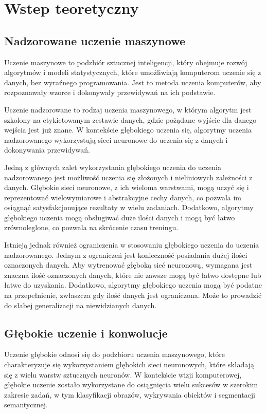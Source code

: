 \newpage %
\section{Wstep teoretyczny}


\subsection{Nadzorowane uczenie maszynowe}
Uczenie maszynowe to podzbiór sztucznej inteligencji, który obejmuje rozwój algorytmów i modeli statystycznych, które umożliwiają komputerom uczenie się z danych, bez wyraźnego programowania. Jest to metoda uczenia komputerów, aby rozpoznawały wzorce i dokonywały przewidywań na ich podstawie.

Uczenie nadzorowane to rodzaj uczenia maszynowego, w którym algorytm jest szkolony na etykietowanym zestawie danych, gdzie pożądane wyjście dla danego wejścia jest już znane. W kontekście głębokiego uczenia się, algorytmy uczenia nadzorowanego wykorzystują sieci neuronowe do uczenia się z danych i dokonywania przewidywań.

Jedną z głównych zalet wykorzystania głębokiego uczenia do uczenia nadzorowanego jest możliwość uczenia się złożonych i nieliniowych zależności z danych. Głębokie sieci neuronowe, z ich wieloma warstwami, mogą uczyć się i reprezentować wielowymiarowe i abstrakcyjne cechy danych, co pozwala im osiągnąć satysfakcjonujące rezultaty w wielu zadaniach. Dodatkowo, algorytmy głębokiego uczenia mogą obsługiwać duże ilości danych i mogą być łatwo zrównoleglone, co pozwala na skrócenie czasu treningu.

Istnieją jednak również ograniczenia w stosowaniu głębokiego uczenia do uczenia nadzorowanego. Jednym z ograniczeń jest konieczność posiadania dużej ilości oznaczonych danych. Aby wytrenować głęboką sieć neuronową, wymagana jest znaczna ilość oznaczonych danych, które nie zawsze mogą być łatwo dostępne lub łatwe do uzyskania. Dodatkowo, algorytmy głębokiego uczenia mogą być podatne na przepełnienie, zwłaszcza gdy ilość danych jest ograniczona. Może to prowadzić do słabej generalizacji na niewidzianych danych.
\subsection{Głębokie uczenie i konwolucje}
Uczenie głębokie odnosi się do podzbioru uczenia maszynowego, które charakteryzuje się wykorzystaniem głębokich sieci neuronowych, które składają się z wielu warstw sztucznych neuronów. W kontekście wizji komputerowej, głębokie uczenie zostało wykorzystane do osiągnięcia wielu sukcesów w szerokim zakresie zadań, w tym klasyfikacji obrazów, wykrywania obiektów i segmentacji semantycznej.

